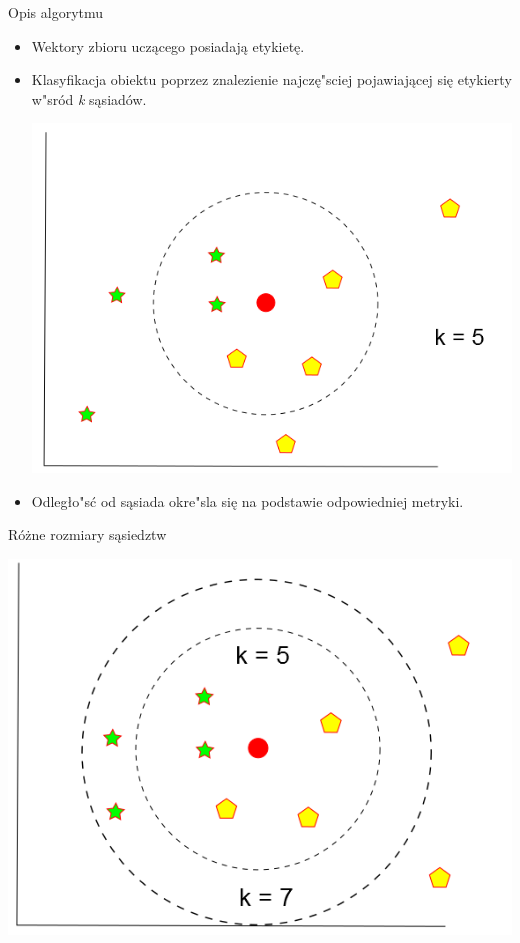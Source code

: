\begin{frame}{Opis algorytmu}
\begin{itemize}
	\item Wektory zbioru uczącego posiadają etykietę.
	\item Klasyfikacja obiektu poprzez znalezienie najczę"sciej pojawiającej się etykierty w"sród \emph{k} sąsiadów.
	\begin{center}
		\includegraphics[keepaspectratio=true, scale=0.3]{neigh_small}
	\end{center}
	\item Odległo"sć od sąsiada okre"sla się na podstawie odpowiedniej metryki.
\end{itemize}
\end{frame}

\begin{frame}{Różne rozmiary sąsiedztw}
\begin{center}
	\includegraphics[keepaspectratio=true, scale=0.55]{neigh_k_small}
\end{center}
\end{frame}





